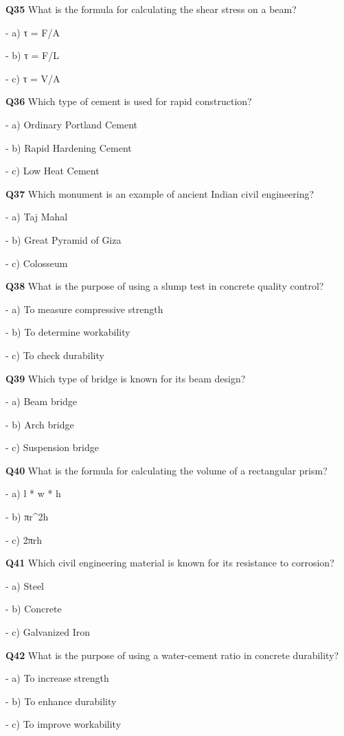 \textbf{Q35} What is the formula for calculating the shear stress on a beam?\par
\quad - a) τ = F/A\par
\quad - b) τ = F/L\par
\quad - c) τ = V/A\par

\textbf{Q36} Which type of cement is used for rapid construction?\par
\quad - a) Ordinary Portland Cement\par
\quad - b) Rapid Hardening Cement\par
\quad - c) Low Heat Cement\par

\textbf{Q37} Which monument is an example of ancient Indian civil engineering?\par
\quad - a) Taj Mahal\par
\quad - b) Great Pyramid of Giza\par
\quad - c) Colosseum\par

\textbf{Q38} What is the purpose of using a slump test in concrete quality control?\par
\quad - a) To measure compressive strength\par
\quad - b) To determine workability\par
\quad - c) To check durability\par

\textbf{Q39} Which type of bridge is known for its beam design?\par
\quad - a) Beam bridge\par
\quad - b) Arch bridge\par
\quad - c) Suspension bridge\par

\textbf{Q40} What is the formula for calculating the volume of a rectangular prism?\par
\quad - a) l * w * h\par
\quad - b) πr^2h\par
\quad - c) 2πrh\par

\textbf{Q41} Which civil engineering material is known for its resistance to corrosion?\par
\quad - a) Steel\par
\quad - b) Concrete\par
\quad - c) Galvanized Iron\par

\textbf{Q42} What is the purpose of using a water-cement ratio in concrete durability?\par
\quad - a) To increase strength\par
\quad - b) To enhance durability\par
\quad - c) To improve workability\par

